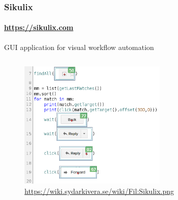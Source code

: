 \documentclass{beamer}
\begin{document}
    \begin{frame}
        \frametitle{Sikulix}
        \framesubtitle{\url{https://sikulix.com}}

        GUI application for visual workflow automation

        \begin{columns}

            \begin{column}{7cm}
                \begin{figure}
                    \includegraphics[width=7cm]{Images/sikulix_example.png}
                    \tiny{\url{https://wiki.sydarkivera.se/wiki/Fil:Sikulix.png}}
                \end{figure}
            \end{column}
        \end{columns}
    \end{frame}
\end{document}
